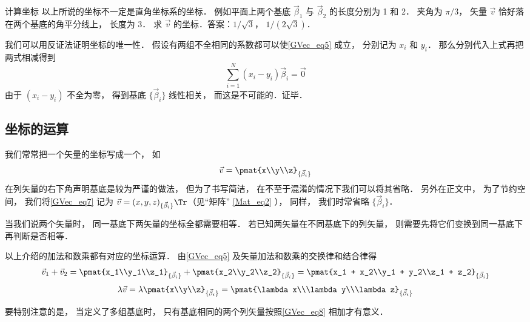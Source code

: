 \begin{exer}{计算坐标}
以上所说的坐标不一定是直角坐标系的坐标． 例如平面上两个基底 $\vec \beta_1$ 与 $\vec \beta_2$ 的长度分别为 1 和 2． 夹角为 $\pi/3$， 矢量 $\vec v$ 恰好落在两个基底的角平分线上， 长度为 3． 求 $\vec v$ 的坐标．答案：$1/\sqrt 3$， $1/(2\sqrt 3)$．
\end{exer}

我们可以用反证法证明坐标的唯一性． 假设有两组不全相同的系数都可以使\autoref{GVec_eq5} 成立， 分别记为 $x_i$ 和 $y_i$． 那么分别代入上式再把两式相减得到
\begin{equation}
\sum_{i=1}^N (x_i-y_i) \vec \beta_i = \vec 0
\end{equation}
由于 $(x_i-y_i)$ 不全为零， 得到基底 $\{\vec \beta_i\}$ 线性相关， 而这是不可能的．证毕．

\subsection{坐标的运算}
我们常常把一个矢量的坐标写成一个， 如
\begin{equation}\label{GVec_eq7}
\vec v = \pmat{x\\y\\z}_{\{\vec\beta_i\}}
\end{equation}
在列矢量的右下角声明基底是较为严谨的做法， 但为了书写简洁， 在不至于混淆的情况下我们可以将其省略． 另外在正文中， 为了节约空间， 我们将\autoref{GVec_eq7} 记为 $\vec v = (x, y, z)_{\{\vec\beta_i\}}\Tr$（见“矩阵” \autoref{Mat_eq2} ）， 同样， 我们时常省略 $\{\vec\beta_i\}$．

当我们说两个矢量时， 同一基底下两矢量的坐标全都需要相等． 若已知两矢量在不同基底下的列矢量， 则需要先将它们变换到同一基底下再判断是否相等．

以上介绍的加法和数乘都有对应的坐标运算． 由\autoref{GVec_eq5} 及矢量加法和数乘的交换律和结合律得
\begin{equation}\label{GVec_eq8}
\vec v_1 + \vec v_2 = \pmat{x_1\\y_1\\z_1}_{\{\vec\beta_i\}} + \pmat{x_2\\y_2\\z_2}_{\{\vec\beta_i\}} = \pmat{x_1 + x_2\\y_1 + y_2\\z_1 + z_2}_{\{\vec\beta_i\}}
\end{equation}
\begin{equation}\label{GVec_eq9}
\lambda \vec v = \lambda\pmat{x\\y\\z}_{\{\vec\beta_i\}} = \pmat{\lambda x\\\lambda y\\\lambda z}_{\{\vec\beta_i\}}
\end{equation}

要特别注意的是， 当定义了多组基底时， 只有基底相同的两个列矢量按照\autoref{GVec_eq8} 相加才有意义．
